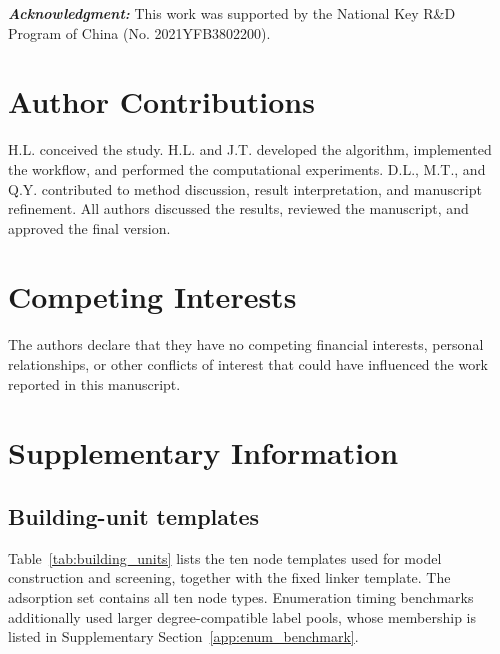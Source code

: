 \documentclass[a5paper, 10pt]{article}
\newcommand{\acknowledgment}[1]{\vspace{5mm}\singlespacing
  {\noindent\textbf{\textit{Acknowledgment\/:}} #1}
}
\begin{document}
\acknowledgment{This work was supported by the National Key R\&D Program of China (No. 2021YFB3802200).}

\section*{Author Contributions}
H.L. conceived the study. H.L. and J.T. developed the algorithm, implemented the workflow, and performed the computational experiments. D.L., M.T., and Q.Y. contributed to method discussion, result interpretation, and manuscript refinement. All authors discussed the results, reviewed the manuscript, and approved the final version.


\section*{Competing Interests}
The authors declare that they have no competing financial interests, personal relationships, or other conflicts of interest that could have influenced the work reported in this manuscript.



\singlespacing





\clearpage
\appendix
\section{Supplementary Information}
\label{app:supplementary}
\setcounter{equation}{0}
\renewcommand{\theequation}{A\arabic{equation}}
\renewcommand{\theHequation}{A.\arabic{equation}}
\setcounter{table}{0}
\renewcommand{\thetable}{A\arabic{table}}
\renewcommand{\theHtable}{A.\arabic{table}}
\setcounter{figure}{0}
\renewcommand{\thefigure}{A\arabic{figure}}
\renewcommand{\theHfigure}{A.\arabic{figure}}
\subsection{Building-unit templates}
\label{app:building_units}

Table~\ref{tab:building_units} lists the ten node templates used for model construction and screening, together with the fixed linker template. The adsorption set contains all ten node types. Enumeration timing benchmarks additionally used larger degree-compatible label pools, whose membership is listed in Supplementary Section~\ref{app:enum_benchmark}.
\end{document}
